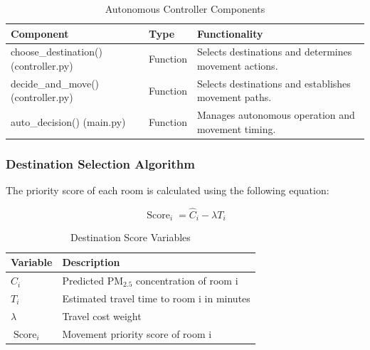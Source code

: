 \documentclass[conference]{IEEEtran}
\newlength{\tablebodywidth}
\newcommand{\pmfine}{\ensuremath{\mathrm{PM}_{2.5}}}
\begin{document}
\begin{table}[!t]
\caption{Autonomous Controller Components}
\label{tab:t13}
\centering\footnotesize
\setlength{\tabcolsep}{3pt}
\setlength{\tablebodywidth}{\dimexpr\columnwidth-18pt\relax}
\begin{tabular}{>{\raggedright\arraybackslash}p{0.370\tablebodywidth}>{\raggedright\arraybackslash}p{0.200\tablebodywidth}>{\raggedright\arraybackslash}p{0.430\tablebodywidth}}
\toprule
\textbf{Component} & \textbf{Type} & \textbf{Functionality} \\
\midrule
choose\_\allowbreak{}destination() (controller.py) & Function & Selects destinations and determines movement actions. \\
decide\_\allowbreak{}and\_\allowbreak{}move() (controller.py) & Function & Selects destinations and establishes movement paths. \\
auto\_\allowbreak{}decision() (main.py) & Function & Manages autonomous operation and movement timing. \\
\bottomrule
\end{tabular}
\end{table}

\subsubsection{Destination Selection Algorithm}

The priority score of each room is calculated using the following equation:

\begin{equation}
\operatorname{Score}_i=\widehat{C}_i-\lambda T_i
\end{equation}

\begin{table}[!t]
\caption{Destination Score Variables}
\label{tab:t14}
\centering\footnotesize
\setlength{\tabcolsep}{3pt}
\setlength{\tablebodywidth}{\dimexpr\columnwidth-12pt\relax}
\begin{tabular}{>{\raggedright\arraybackslash}p{0.250\tablebodywidth}>{\raggedright\arraybackslash}p{0.750\tablebodywidth}}
\toprule
\textbf{Variable} & \textbf{Description} \\
\midrule
$\widehat{C}_i$ & Predicted \pmfine{} concentration of room i \\
$T_i$ & Estimated travel time to room i in minutes \\
$\lambda$ & Travel cost weight \\
$\operatorname{Score}_i$ & Movement priority score of room i \\
\bottomrule
\end{tabular}
\end{table}
\end{document}
